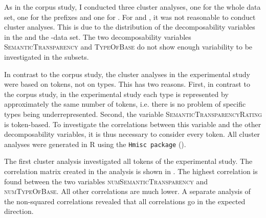 As in the corpus study, I conducted three cluster analyses, one for the whole data set, one for the prefixes and one for .  
For  and , it was not reasonable to conduct cluster analyses. This is due to the distribution of the decomposability variables in the  and the -data set. The two decomposability variables \textsc{SemanticTransparency} and \textsc{TypeOfBase} do not show enough variability to be investigated in the subsets. 


 In contrast to the corpus study, the cluster analyses in the experimental study were based on tokens, not on types. This has two reasons. First, in contrast to the corpus study, in the experimental study each type is represented by approximately the same number of tokens, i.e. there is no problem of specific types being underrepresented. Second, the variable \textsc{SemanticTransparencyRating} is token-based. To investigate the correlations between this variable and the other decomposability variables, it is thus necessary to consider every token.
All cluster analyses were generated in R using the \texttt{Hmisc package} (\citealt{Harrell.2017}).

   The first cluster analysis investigated all tokens of the experimental  study. The correlation matrix created in the analysis is shown in . 
   The highest correlation is found between the two variables \textsc{numSemanticTransparency} and \textsc{numTypeOfBase}. All other correlations are much lower. A separate analysis of the non-squared correlations revealed that all correlations go in the expected direction. 
   
   


